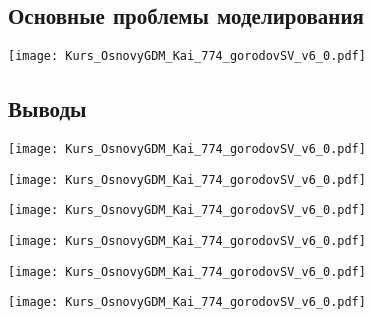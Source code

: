 \documentclass[main.tex]{subfiles}
\begin{document}
\subsection{Основные проблемы моделирования}

\texttt{[image: Kurs\_OsnovyGDM\_Kai\_774\_gorodovSV\_v6\_0.pdf]}

\subsection{Выводы}

\texttt{[image: Kurs\_OsnovyGDM\_Kai\_774\_gorodovSV\_v6\_0.pdf]}

\texttt{[image: Kurs\_OsnovyGDM\_Kai\_774\_gorodovSV\_v6\_0.pdf]}

\texttt{[image: Kurs\_OsnovyGDM\_Kai\_774\_gorodovSV\_v6\_0.pdf]}

\texttt{[image: Kurs\_OsnovyGDM\_Kai\_774\_gorodovSV\_v6\_0.pdf]}

\texttt{[image: Kurs\_OsnovyGDM\_Kai\_774\_gorodovSV\_v6\_0.pdf]}

\texttt{[image: Kurs\_OsnovyGDM\_Kai\_774\_gorodovSV\_v6\_0.pdf]}
\end{document}
